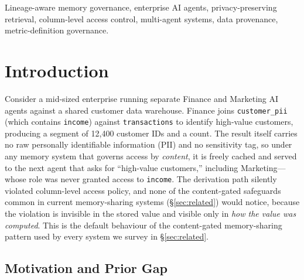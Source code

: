 \documentclass[nolineno]{ieeeaccess}
\begin{document}
\begin{IEEEkeywords}
Lineage-aware memory governance, enterprise AI agents, privacy-preserving
retrieval, column-level access control, multi-agent systems, data
provenance, metric-definition governance.
\end{IEEEkeywords}

\maketitle

\section{Introduction}
\label{sec:intro}

Consider a mid-sized enterprise running separate Finance and Marketing AI
agents against a shared customer data warehouse.
Finance joins \texttt{customer\_pii} (which contains \texttt{income}) against
\texttt{transactions} to identify high-value customers, producing a segment
of 12,400 customer IDs and a count.
The result itself carries no raw personally identifiable information (PII) and no sensitivity tag, so under any
memory system that governs access by \emph{content}, it is freely cached and
served to the next agent that asks for ``high-value customers,'' including
Marketing---whose role was never granted access to \texttt{income}.
The derivation path silently violated column-level access policy, and none
of the content-gated safeguards common in current memory-sharing systems
(\S\ref{sec:related}) would notice, because the violation is invisible in
the stored value and visible only in \emph{how the value was computed}.
This is the default behaviour of the content-gated memory-sharing pattern
used by every system we survey in \S\ref{sec:related}.

\subsection{Motivation and Prior Gap}
\end{document}
